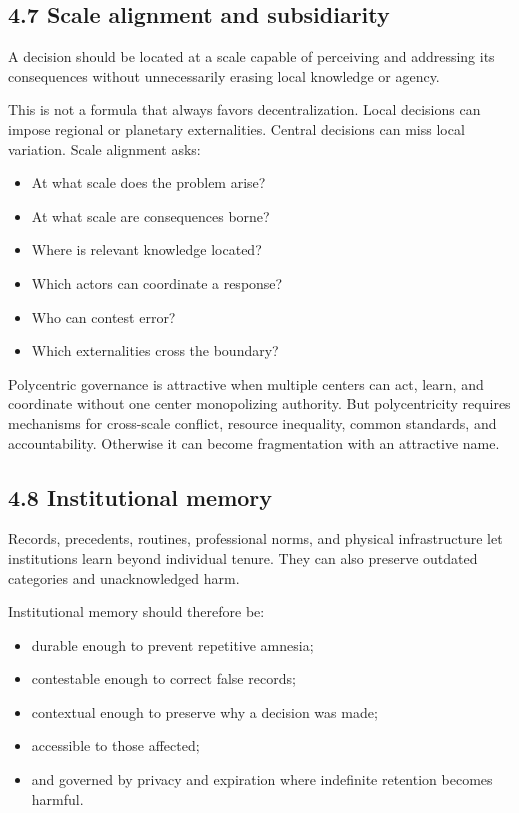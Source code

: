 \documentclass[
  11pt,
]{article}
\providecommand{\tightlist}{%
  \setlength{\itemsep}{0pt}\setlength{\parskip}{0pt}}
\begin{document}
\subsection{4.7 Scale alignment and
subsidiarity}\label{scale-alignment-and-subsidiarity}

A decision should be located at a scale capable of perceiving and
addressing its consequences without unnecessarily erasing local
knowledge or agency.

This is not a formula that always favors decentralization. Local
decisions can impose regional or planetary externalities. Central
decisions can miss local variation. Scale alignment asks:

\begin{itemize}
\tightlist
\item
  At what scale does the problem arise?
\item
  At what scale are consequences borne?
\item
  Where is relevant knowledge located?
\item
  Which actors can coordinate a response?
\item
  Who can contest error?
\item
  Which externalities cross the boundary?
\end{itemize}

Polycentric governance is attractive when multiple centers can act,
learn, and coordinate without one center monopolizing authority. But
polycentricity requires mechanisms for cross-scale conflict, resource
inequality, common standards, and accountability. Otherwise it can
become fragmentation with an attractive name.

\subsection{4.8 Institutional memory}\label{institutional-memory}

Records, precedents, routines, professional norms, and physical
infrastructure let institutions learn beyond individual tenure. They can
also preserve outdated categories and unacknowledged harm.

Institutional memory should therefore be:

\begin{itemize}
\tightlist
\item
  durable enough to prevent repetitive amnesia;
\item
  contestable enough to correct false records;
\item
  contextual enough to preserve why a decision was made;
\item
  accessible to those affected;
\item
  and governed by privacy and expiration where indefinite retention
  becomes harmful.
\end{itemize}
\end{document}
